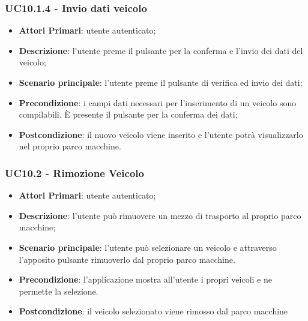 \subsubsection{UC10.1.4 - Invio dati veicolo}
\begin{itemize}
	\item \textbf{Attori Primari}: utente autenticato;
	\item \textbf{Descrizione}: l'utente preme il pulsante per la conferma e l'invio dei dati del veicolo;
	\item \textbf{Scenario principale}: l'utente preme il pulsante di verifica ed invio dei dati;	
	\item \textbf{Precondizione}: i campi dati necessari per l'inserimento di un veicolo sono compilabili. È presente il pulsante per la conferma dei dati;
	\item \textbf{Postcondizione}: il nuovo veicolo viene inserito e l'utente potrà visualizzarlo nel proprio parco macchine.
\end{itemize}

\subsubsection{UC10.2 - Rimozione Veicolo}
\begin{itemize}
	\item \textbf{Attori Primari}: utente autenticato;
	\item \textbf{Descrizione}: l'utente può rimuovere un mezzo di trasporto al proprio parco macchine;
	\item \textbf{Scenario principale}: l'utente può selezionare un veicolo e attraverso l'apposito pulsante rimuoverlo dal proprio parco macchine.
	\item \textbf{Precondizione}: l'applicazione mostra all'utente i propri veicoli e ne permette la selezione.
	\item \textbf{Postcondizione}: il veicolo selezionato viene rimosso dal parco macchine
\end{itemize}